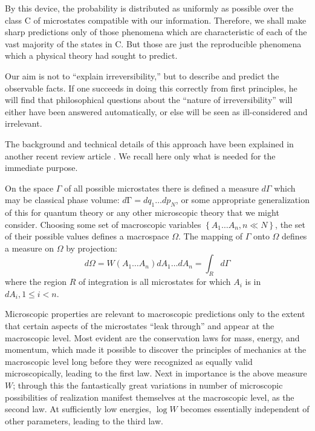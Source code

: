 \documentclass{article}
\begin{document}
By this device, the probability is distributed as uniformly as possible over the class C of microstates compatible with our information. Therefore, we shall make sharp predictions only of those phenomena which are characteristic of each of the vast majority of the states in C. But those are just the reproducible phenomena which a physical theory had sought to predict.

Our aim is not to ``explain irreversibility,'' but to describe and predict the observable facts. If one succeeds in doing this correctly from first principles, he will find that philosophical questions about the ``nature of irreversibility'' will either have been answered automatically, or else will be seen as ill-considered and irrelevant. 

The background and technical details of this approach have been explained in another recent review article \cite{jaynes1978}. We recall here only what is needed for the immediate purpose.

On the space $\Gamma$ of all possible microstates there is defined a measure $d \Gamma$ which may be classical phase volume: $d \mathrm{\Gamma}=d q_1 \ldots d p_N$, or some appropriate generalization of this for quantum theory or any other microscopic theory that we might consider. Choosing some set of macroscopic variables $\left\{A_1 \ldots A_n, n \ll N\right\}$, the set of their possible values defines a macrospace $\Omega$. The mapping of $\Gamma$ onto $\Omega$ defines a measure on $\Omega$ by projection:
\begin{equation}
d \Omega=W\left(A_1 \ldots A_n\right) d A_1 \ldots d A_n=\int_R d \Gamma
\end{equation}
where the region $R$ of integration is all microstates for which $A_i$ is in $d A_i, 1 \leqslant i<n$.

Microscopic properties are relevant to macroscopic predictions only to the extent that certain aspects of the microstates ``leak through'' and appear at the macroscopic level. Most evident are the conservation laws for mass, energy, and momentum, which made it possible to discover the principles of mechanics at the macroscopic level long before they were recognized as equally valid microscopically, leading to the first law. Next in importance is the above measure $W$; through this the fantastically great variations in number of microscopic possibilities of realization manifest themselves at the macroscopic level, as the second law. At sufficiently low energies, $\log W$ becomes essentially independent of other parameters, leading to the third law.
\end{document}
